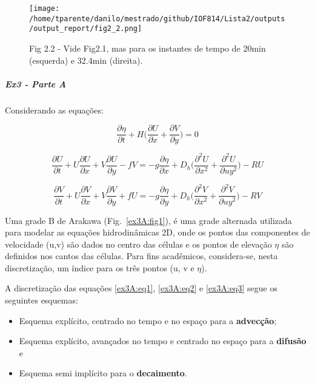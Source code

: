 \documentclass[11pt]{article}
\makeatletter
\def\maxwidth{\ifdim\Gin@nat@width>\linewidth\linewidth
    \else\Gin@nat@width\fi}
\let\Oldincludegraphics\includegraphics
\renewcommand{\includegraphics}[1]{\Oldincludegraphics[width=.8\maxwidth]{#1}}
\providecommand{\tightlist}{%
      \setlength{\itemsep}{0pt}\setlength{\parskip}{0pt}}
\makeatother
\begin{document}
\begin{figure}
\centering
\texttt{[image: /home/tparente/danilo/mestrado/github/IOF814/Lista2/outputs/output\_report/fig2\_2.png]}
\caption{Fig 2.2 - Vide Fig2.1, mas para os instantes de tempo de 20min (esquerda) e 32.4min (direita).}
\label{fig2:2}
\end{figure}

    \subparagraph{Ex3 - Parte A}\label{ex3---parte-a}

Considerando as equações:

\begin{equation}
    \frac{\partial{\eta}}{\partial{t}} + H \bigg( \frac{\partial{U}}{\partial{x}} + \frac{\partial{V}}{\partial{y}} \bigg) = 0
    \label{ex3A:eq1}
\end{equation}

\begin{equation}
    \frac{\partial{U}}{\partial{t}} + U\frac{\partial{U}}{\partial{x}} + V\frac{\partial{U}}{\partial{y}} - fV = -g\frac{\partial{\eta}}{\partial{x}} + D_h \bigg( \frac{\partial^2{U}}{\partial{x^2}} + \frac{\partial^2{U}}{\partial{uy^2}} \bigg) - RU
    \label{ex3A:eq2}
\end{equation}

\begin{equation}
    \frac{\partial{V}}{\partial{t}} + U\frac{\partial{V}}{\partial{x}} + V\frac{\partial{V}}{\partial{y}} + fU = -g\frac{\partial{\eta}}{\partial{y}} + D_h \bigg( \frac{\partial^2{V}}{\partial{x^2}} + \frac{\partial^2{V}}{\partial{uy^2}} \bigg) - RV
    \label{ex3A:eq3}
\end{equation}

Uma grade B de Arakawa (Fig.~\ref{ex3A:fig1}), é uma
grade alternada utilizada para modelar as equações hidrodinâmicas 2D,
onde os pontos das componentes de velocidade (u,v) são dados no centro
das células e os pontos de elevação \(\eta\) são definidos nos cantos
das células. Para fins acadêmicos, considera-se, nesta discretização,
um índice para os três pontos (u, v e \(\eta\)).

A discretização das equações \ref{ex3A:eq1}, \ref{ex3A:eq2} e
\ref{ex3A:eq3} segue os seguintes esquemas:

\begin{itemize}
\tightlist
\item
  Esquema explícito, centrado no tempo e no espaço para a
  \textbf{advecção};
\item
  Esquema explícito, avançados no tempo e centrado no espaço para a
  \textbf{difusão} e
\item
  Esquema semi implícito para o \textbf{decaimento}.
\end{itemize}
\end{document}

